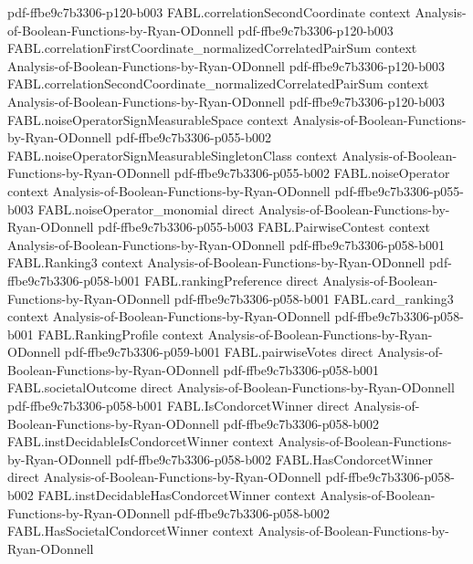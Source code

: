 \begin{theorem}
  {pdf-ffbe9c7b3306-p120-b003}
\proofstep
  {FABL.correlationSecondCoordinate}
  {context}
  {Analysis-of-Boolean-Functions-by-Ryan-ODonnell}
  {pdf-ffbe9c7b3306-p120-b003}
\proofstep
  {FABL.correlationFirstCoordinate_normalizedCorrelatedPairSum}
  {context}
  {Analysis-of-Boolean-Functions-by-Ryan-ODonnell}
  {pdf-ffbe9c7b3306-p120-b003}
\proofstep
  {FABL.correlationSecondCoordinate_normalizedCorrelatedPairSum}
  {context}
  {Analysis-of-Boolean-Functions-by-Ryan-ODonnell}
  {pdf-ffbe9c7b3306-p120-b003}
\proofstep
  {FABL.noiseOperatorSignMeasurableSpace}
  {context}
  {Analysis-of-Boolean-Functions-by-Ryan-ODonnell}
  {pdf-ffbe9c7b3306-p055-b002}
\proofstep
  {FABL.noiseOperatorSignMeasurableSingletonClass}
  {context}
  {Analysis-of-Boolean-Functions-by-Ryan-ODonnell}
  {pdf-ffbe9c7b3306-p055-b002}
\proofstep
  {FABL.noiseOperator}
  {context}
  {Analysis-of-Boolean-Functions-by-Ryan-ODonnell}
  {pdf-ffbe9c7b3306-p055-b003}
\proofstep
  {FABL.noiseOperator_monomial}
  {direct}
  {Analysis-of-Boolean-Functions-by-Ryan-ODonnell}
  {pdf-ffbe9c7b3306-p055-b003}
\proofstep
  {FABL.PairwiseContest}
  {context}
  {Analysis-of-Boolean-Functions-by-Ryan-ODonnell}
  {pdf-ffbe9c7b3306-p058-b001}
\proofstep
  {FABL.Ranking3}
  {context}
  {Analysis-of-Boolean-Functions-by-Ryan-ODonnell}
  {pdf-ffbe9c7b3306-p058-b001}
\proofstep
  {FABL.rankingPreference}
  {direct}
  {Analysis-of-Boolean-Functions-by-Ryan-ODonnell}
  {pdf-ffbe9c7b3306-p058-b001}
\proofstep
  {FABL.card_ranking3}
  {context}
  {Analysis-of-Boolean-Functions-by-Ryan-ODonnell}
  {pdf-ffbe9c7b3306-p058-b001}
\proofstep
  {FABL.RankingProfile}
  {context}
  {Analysis-of-Boolean-Functions-by-Ryan-ODonnell}
  {pdf-ffbe9c7b3306-p059-b001}
\proofstep
  {FABL.pairwiseVotes}
  {direct}
  {Analysis-of-Boolean-Functions-by-Ryan-ODonnell}
  {pdf-ffbe9c7b3306-p058-b001}
\proofstep
  {FABL.societalOutcome}
  {direct}
  {Analysis-of-Boolean-Functions-by-Ryan-ODonnell}
  {pdf-ffbe9c7b3306-p058-b001}
\proofstep
  {FABL.IsCondorcetWinner}
  {direct}
  {Analysis-of-Boolean-Functions-by-Ryan-ODonnell}
  {pdf-ffbe9c7b3306-p058-b002}
\proofstep
  {FABL.instDecidableIsCondorcetWinner}
  {context}
  {Analysis-of-Boolean-Functions-by-Ryan-ODonnell}
  {pdf-ffbe9c7b3306-p058-b002}
\proofstep
  {FABL.HasCondorcetWinner}
  {direct}
  {Analysis-of-Boolean-Functions-by-Ryan-ODonnell}
  {pdf-ffbe9c7b3306-p058-b002}
\proofstep
  {FABL.instDecidableHasCondorcetWinner}
  {context}
  {Analysis-of-Boolean-Functions-by-Ryan-ODonnell}
  {pdf-ffbe9c7b3306-p058-b002}
\proofstep
  {FABL.HasSocietalCondorcetWinner}
  {context}
  {Analysis-of-Boolean-Functions-by-Ryan-ODonnell}

\end{theorem}
